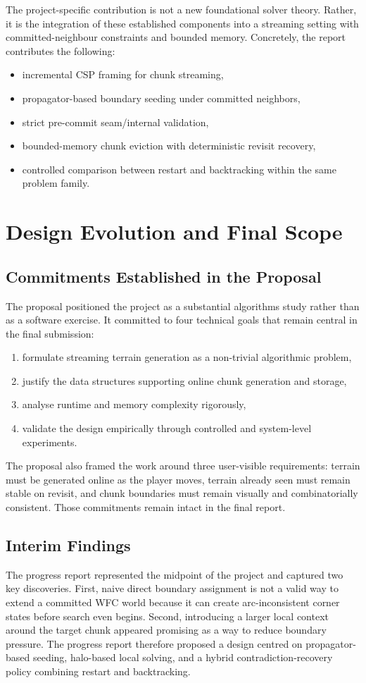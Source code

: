 \documentclass[12pt,a4paper]{report}
\begin{document}
The project-specific contribution is not a new foundational solver theory. Rather, it is the integration of these established components into a streaming setting with committed-neighbour constraints and bounded memory. Concretely, the report contributes the following:
\begin{itemize}
\item incremental CSP framing for chunk streaming,
\item propagator-based boundary seeding under committed neighbors,
\item strict pre-commit seam/internal validation,
\item bounded-memory chunk eviction with deterministic revisit recovery,
\item controlled comparison between restart and backtracking within the same problem family.
\end{itemize}

\chapter{Design Evolution and Final Scope}
\section{Commitments Established in the Proposal}
The proposal positioned the project as a substantial algorithms study rather than as a software exercise. It committed to four technical goals that remain central in the final submission:
\begin{enumerate}
\item formulate streaming terrain generation as a non-trivial algorithmic problem,
\item justify the data structures supporting online chunk generation and storage,
\item analyse runtime and memory complexity rigorously,
\item validate the design empirically through controlled and system-level experiments.
\end{enumerate}

The proposal also framed the work around three user-visible requirements: terrain must be generated online as the player moves, terrain already seen must remain stable on revisit, and chunk boundaries must remain visually and combinatorially consistent. Those commitments remain intact in the final report.

\section{Interim Findings}
The progress report represented the midpoint of the project and captured two key discoveries. First, naive direct boundary assignment is not a valid way to extend a committed WFC world because it can create arc-inconsistent corner states before search even begins. Second, introducing a larger local context around the target chunk appeared promising as a way to reduce boundary pressure. The progress report therefore proposed a design centred on propagator-based seeding, halo-based local solving, and a hybrid contradiction-recovery policy combining restart and backtracking.
\end{document}
